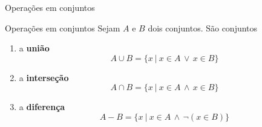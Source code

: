 \begin{frame}[fragile]{Operações em conjuntos}

    \begin{block}{Operações em conjuntos}
        Sejam $A$ e $B$ dois conjuntos. São conjuntos
        \begin{enumerate}
            \item a \textbf{união}
            \[
                A \cup B = \lbrace x\ |\ x\in A\, \vee\, x\in B\rbrace
            \]

            \item a \textbf{interseção}
            \[
                A \cap B = \lbrace x\ |\ x\in A\, \land\, x\in B\rbrace
            \]

            \item a \textbf{diferença}
            \[
                A - B = \lbrace x\ |\ x\in A\, \land\, \lnot (x\in B)\rbrace
            \]
        \end{enumerate}
    \end{block}

\end{frame}
